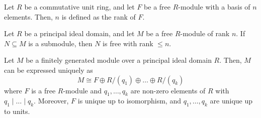 \documentclass[11pt]{article}
\theoremstyle{definition}
\theoremstyle{remark}
\numberwithin{equation}{section}
\begin{document}
    \begin{definition}
        Let $R$ be a commutative unit ring, and let $F$ be a free $R$-module with a
        basis of $n$ elements. Then, $n$ is defined as the rank of $F$.
    \end{definition}

    \begin{lemma}
        Let $R$ be a principal ideal domain, and let $M$ be a free $R$-module of rank
        $n$. If $N \subseteq M$ is a submodule, then $N$ is free with rank $\leq n$.
    \end{lemma}


    \begin{theorem}
        Let $M$ be a finitely generated module over a principal ideal domain $R$.
        Then, $M$ can be expressed uniquely as \[
            M \cong F\oplus R/(q_1) \oplus \dots \oplus R/(q_k)
        \] where $F$ is a free $R$-module and $q_1, \dots, q_k$ are non-zero elements
        of $R$ with $q_1\mid \dots \mid q_k$. Moreover, $F$ is unique up to
        isomorphism, and $q_1, \dots, q_k$ are unique up to units.
    \end{theorem}
\end{document}
